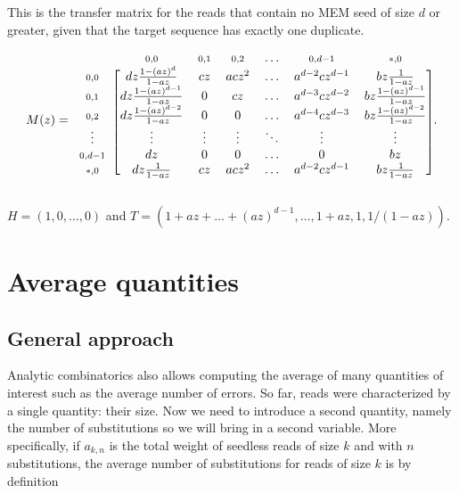 \documentclass{article}
\begin{document}
This is the transfer matrix for the reads that contain no MEM seed of size
$d$ or greater, given that the target sequence has exactly one duplicate.

\begin{equation*}
M(z) =
\begin{blockarray}{ccccccc}
   & \scriptstyle{0,0} & \scriptstyle{0,1} & \scriptstyle{0,2}
   & \ldots & \scriptstyle{0,d-1} & \scriptstyle{*,0} \\
\begin{block}{c[cccccc]}
\scriptstyle{0,0} & dz\frac{1-(az)^d}{1-az} &
    cz & acz^2 & \ldots & a^{d-2}cz^{d-1} & bz\frac{1}{1-az} \\
\scriptstyle{0,1} & dz \frac{1-(az)^{d-1}}{1-az} & 0 & cz &
    \ldots & a^{d-3}cz^{d-2} & bz\frac{1-(az)^{d-1}}{1-az} \\
\scriptstyle{0,2} & dz\frac{1-(az)^{d-2}}{1-az} & 0 & 0 &
    \ldots & a^{d-4}cz^{d-3} & bz\frac{1-(az)^{d-2}}{1-az}  \\
\vdots & \vdots & \vdots & \vdots & \ddots & \vdots & \vdots \\
\scriptstyle{0,d-1} & dz & 0 & 0 & \ldots & 0 & bz \\
\scriptstyle{*,0} & dz\frac{1}{1-az} & cz & acz^2 &
    \ldots & a^{d-2}cz^{d-1} & bz\frac{1}{1-az} \\
\end{block}
\end{blockarray}.
\end{equation*}

$H=(1,0,\ldots,0)$ and $T=(1+az+\ldots+(az)^{d-1}, \ldots, 1+az, 1,
1/(1-az))$.









\section{Average quantities}
\label{sec:av}

\subsection{General approach}
\label{sec:genapp}
Analytic combinatorics also allows computing the average of many
quantities of interest such as the average number of errors.  So far,
reads were characterized by a single quantity: their size. Now we need to
introduce a second quantity, namely the number of substitutions so we will
bring in a second variable. More specifically, if $a_{k,n}$ is the total
weight of seedless reads of size $k$ and with $n$ substitutions, the
average number of substitutions for reads of size $k$ is by definition
\end{document}
